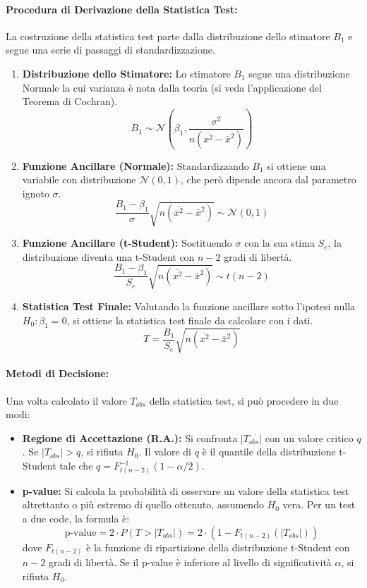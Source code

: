 \paragraph{Procedura di Derivazione della Statistica Test:}
La costruzione della statistica test parte dalla distribuzione dello stimatore \(B_1\) e segue una serie di passaggi di standardizzazione.

\begin{enumerate}
    \item \textbf{Distribuzione dello Stimatore:} Lo stimatore \(B_1\) segue una distribuzione Normale la cui varianza è nota dalla teoria (si veda l'applicazione del Teorema di Cochran).
    \[
        B_1 \sim \mathcal{N}\left(\beta_1, \frac{\sigma^2}{n(\overline{x^2}-\bar{x}^2)}\right)
    \]

    \item \textbf{Funzione Ancillare (Normale):} Standardizzando \(B_1\) si ottiene una variabile con distribuzione \(\mathcal{N}(0,1)\), che però dipende ancora dal parametro ignoto \(\sigma\).
    \[
        \frac{B_1 - \beta_1}{\sigma} \sqrt{n(\overline{x^2}-\bar{x}^2)} \sim \mathcal{N}(0,1)
    \]
    
    \item \textbf{Funzione Ancillare (t-Student):} Sostituendo \(\sigma\) con la sua stima \(S_e\), la distribuzione diventa una t-Student con \(n-2\) gradi di libertà.
    \[
        \frac{B_1 - \beta_1}{S_e} \sqrt{n(\overline{x^2}-\bar{x}^2)} \sim t(n-2)
    \]
    
    \item \textbf{Statistica Test Finale:} Valutando la funzione ancillare sotto l'ipotesi nulla \(H_0: \beta_1 = 0\), si ottiene la statistica test finale da calcolare con i dati.
    \[
        T = \frac{B_1}{S_e} \sqrt{n(\overline{x^2}-\bar{x}^2)}
    \]
\end{enumerate}

\paragraph{Metodi di Decisione:}
Una volta calcolato il valore \(T_{obs}\) della statistica test, si può procedere in due modi:

\begin{itemize}
    \item \textbf{Regione di Accettazione (R.A.):} Si confronta \(|T_{obs}|\) con un valore critico \(q\). Se \(|T_{obs}| > q\), si rifiuta \(H_0\). Il valore di \(q\) è il quantile della distribuzione t-Student tale che \(q = F_{t(n-2)}^{-1}(1-\alpha/2)\).

    \item \textbf{p-value:} Si calcola la probabilità di osservare un valore della statistica test altrettanto o più estremo di quello ottenuto, assumendo \(H_0\) vera. Per un test a due code, la formula è:
    \[
        \text{p-value} = 2 \cdot P(T > |T_{obs}|) = 2 \cdot (1 - F_{t(n-2)}(|T_{obs}|))
    \]
    dove \(F_{t(n-2)}\) è la funzione di ripartizione della distribuzione t-Student con \(n-2\) gradi di libertà. Se il p-value è inferiore al livello di significatività \(\alpha\), si rifiuta \(H_0\).
\end{itemize}

